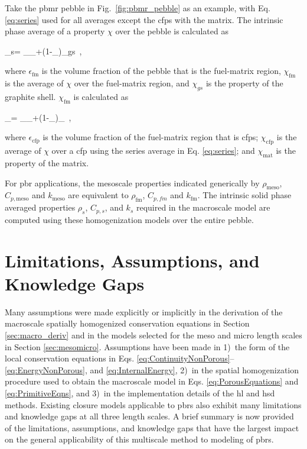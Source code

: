 Take the \gls{pbmr} pebble in Fig.\ \ref{fig:pbmr_pebble} as an example, with Eq. \eqref{eq:series} used for all averages except the \glspl{cfp} with the matrix. The intrinsic phase average of a property \(\chi\) over the pebble is calculated as

\beq
\label{eq:NonTransport2}
\chi_s= \epsilon_\chi_+(1-\epsilon_)\chi_{gs}\ ,
\eeq

\noindent where \(\epsilon_\text{fm}\) is the volume fraction of the pebble that is the fuel-matrix region, \(\chi_\text{fm}\) is the average of \(\chi\) over the fuel-matrix region, and \(\chi_{gs}\) is the property of the graphite shell. \(\chi_\text{fm}\) is calculated as

\beq
\label{eq:NonTransport}
\chi_= \epsilon_\chi_+(1-\epsilon_)\chi_\ ,
\eeq

\noindent where \(\epsilon_\text{cfp}\) is the volume fraction of the fuel-matrix region that is \glspl{cfp}; \(\chi_\text{cfp}\) is the average of \(\chi\) over a \gls{cfp} using the series average in Eq. \eqref{eq:series}; and \(\chi_\text{mat}\) is the property of the matrix. 

For \gls{pbr} applications, the mesoscale properties indicated generically by \(\rho_\text{meso}\), \(C_{p,\text{meso}}\) and \(k_\text{meso}\) are equivalent to \(\rho_\text{fm}\), \(C_{p,fm}\) and \(k_\text{fm}\). The intrinsic solid phase averaged properties \(\rho_s\), \(C_{p,s}\), and \(k_s\) required in the macroscale model are computed using these homogenization models over the entire pebble.

\section{Limitations, Assumptions, and Knowledge Gaps}
\label{sec:MacroAssumptions}

Many assumptions were made explicitly or implicitly in the derivation of the macroscale spatially homogenized conservation equations in Section \ref{sec:macro_deriv} and in the models selected for the meso and micro length scales in Section \ref{sec:mesomicro}. Assumptions have been made in 1)~the form of the local conservation equations in Eqs. \eqref{eq:ContinuityNonPorous}--\eqref{eq:EnergyNonPorous}, and \eqref{eq:InternalEnergy}, 2)~in the spatial homogenization procedure used to obtain the macroscale model in Eqs. \eqref{eq:PorousEquations} and \eqref{eq:PrimitiveEqns}, and 3)~in the implementation details of the \gls{hl} and \gls{hsd} methods. Existing closure models applicable to \glspl{pbr} also exhibit many limitations and knowledge gaps at all three length scales. A brief summary is now provided of the limitations, assumptions, and knowledge gaps that have the largest impact on the general applicability of this multiscale method to modeling of \glspl{pbr}.

